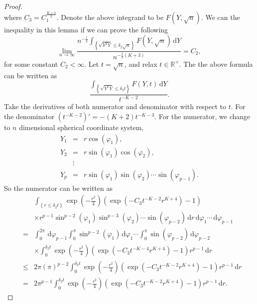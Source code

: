 \documentclass[oneside,english]{amsbook}
\numberwithin{section}{chapter}
\numberwithin{equation}{section}
\numberwithin{figure}{section}
\theoremstyle{plain}
\theoremstyle{plain}
\theoremstyle{definition}
\theoremstyle{plain}
\theoremstyle{plain}
\theoremstyle{remark}
\theoremstyle{definition}
\theoremstyle{definition}
\newcommand{\diff}{\,\mathrm{d}}
\begin{document}
\begin{proof}
\[\]
where $C_{3}=C_{1}^{\frac{K+4}{2}}$. Denote the above integrand to
be $F\left(Y,\sqrt{n}\right)$. We can the inequality in this lemma
if we can prove the following 
\begin{equation}
\lim_{n\rightarrow\infty}\frac{n^{-\frac{1}{2}}\int_{\left\{ \sqrt{Y^{T}Y}\le\delta_{2}\sqrt{n}\right\} }F\left(Y,\sqrt{n}\right)\diff Y}{n^{-\frac{1}{2}\left(K+3\right)}}=C_{2},\label{eq:lim-rhs-vs-lfs-inequality}
\end{equation}
for some constant $C_{2}<\infty$. Let $t=\sqrt{n}$, and relax $t\in\mathbb{R}^{+}$.
The the above formula can be written as 
\[
\frac{\int_{\left\{ \sqrt{Y^{T}Y}\le\delta_{2}t\right\} }F\left(Y,t\right)\diff Y}{t^{-K-2}}.
\]
Take the derivatives of both numerator and denominator with respect
to $t$. For the denominator $\left(t^{-K-2}\right)'=-\left(K+2\right)t^{-K-3}.$
For the numerator, we change to $n$ dimensional spherical coordinate
system, 
\begin{eqnarray*}
Y_{1} & = & r\cos\left(\varphi_{1}\right),\\
Y_{2} & = & r\sin\left(\varphi_{1}\right)\cos\left(\varphi_{2}\right),\\
 & \vdots\\
Y_{p} & = & r\sin\left(\varphi_{1}\right)\sin\left(\varphi_{2}\right)\cdots\sin\left(\varphi_{p-1}\right).
\end{eqnarray*}
So the numerator can be written as 
\begin{eqnarray*}
 &  & \int_{\left\{ r\le\delta_{2}t\right\} }\exp\left(-\frac{r^{2}}{4}\right)\left(\exp\left(-C_{3}t^{-K-2}r^{K+4}\right)-1\right)\\
 &  & \times r^{p-1}\sin^{p-2}\left(\varphi_{1}\right)\sin^{p-3}\left(\varphi_{2}\right)\cdots\sin\left(\varphi_{p-2}\right)\diff r\diff\varphi_{1}\cdots\diff\varphi_{p-1}\\
 & = & \int_{0}^{2\pi}\diff\varphi_{p-1}\int_{0}^{\pi}\sin^{p-2}\left(\varphi_{1}\right)\diff\varphi_{1}\cdots\int_{0}^{\pi}\sin\left(\varphi_{p-2}\right)\diff\varphi_{p-2}\\
 &  & \times\int_{0}^{\delta_{2}t}\exp\left(-\frac{r^{2}}{4}\right)\left(\exp\left(-C_{3}t^{-K-4}r^{K+4}\right)-1\right)r^{p-1}\diff r\\
 & \le & 2\pi\left(\pi\right)^{p-2}\int_{0}^{\delta_{2}t}\exp\left(-\frac{r^{2}}{4}\right)\left(\exp\left(-C_{3}t^{-K-2}r^{K+4}\right)-1\right)r^{p-1}\diff r\\
 & = & 2\pi^{p-1}\int_{0}^{\delta_{2}t}\exp\left(-\frac{r^{2}}{4}\right)\left(\exp\left(-C_{3}t^{-K-2}r^{K+4}\right)-1\right)r^{p-1}\diff r.
\end{eqnarray*}
 

\end{proof}
\end{document}
